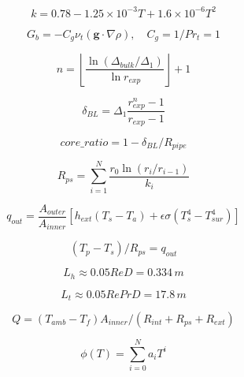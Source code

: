 \[
k=0.78-1.25\times10^{-3}T+1.6\times10^{-6}T^2
\]

\[
G_b=-C_g\nu_t(\mathbf g\cdot\nabla\rho),\quad C_g=1/Pr_t=1
\]

\[
n=\left\lfloor\frac{\ln(\Delta_{bulk}/\Delta_1)}{\ln r_{exp}}\right\rfloor+1
\]

\[
\delta_{BL}=\Delta_1\frac{r_{exp}^{n}-1}{r_{exp}-1}
\]

\[
core\_ratio=1-\delta_{BL}/R_{pipe}
\]

\[
R_{ps}=\sum_{i=1}^{N}\frac{r_0\ln(r_i/r_{i-1})}{k_i}
\]

\[
q_{out}=\frac{A_{outer}}{A_{inner}}[h_{ext}(T_s-T_a)+\epsilon\sigma(T_s^4-T_{sur}^4)]
\]

\[
(T_p-T_s)/R_{ps}=q_{out}
\]

\[
L_h\approx0.05ReD=0.334\,m
\]

\[
L_t\approx0.05RePrD=17.8\,m
\]

\[
Q=(T_{amb}-T_f)A_{inner}/(R_{int}+R_{ps}+R_{ext})
\]

\[
\phi(T)=\sum_{i=0}^{N}a_iT^i
\]
